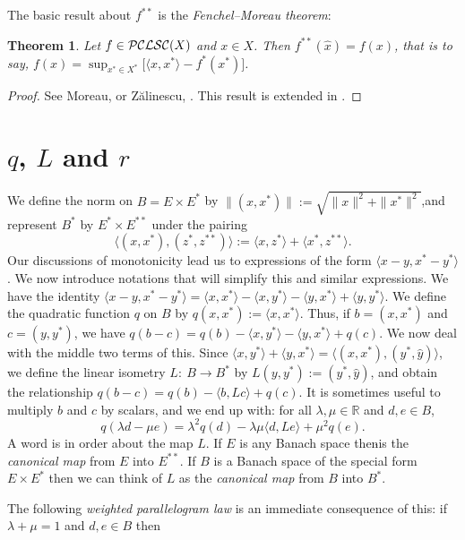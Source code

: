 \documentclass[letterpaper]{article}
\theoremstyle{plain}
\newtheorem{theorem}{Theorem}[section]
\theoremstyle{definition}
\numberwithin{equation}{section}
\newcommand{\bra}[2]{\langle#1,#2\rangle}
\newcommand{\Bra}[2]{\big\langle#1,#2\big\rangle}
\newcommand{\dbs}{^{**}}
\newcommand{\PCLSC}{{\cal PCLSC}}
\newcommand{\RR}{\mathbb R}
\newcommand{\supn}{\sup\nolimits}
\newcommand{\wh}{\widehat}
\newcommand{\Sec}{Section~\ref}
\newcommand{\Thm}{Theorem~\ref}
\begin{document}
%
The basic result about $f\dbs$ is the {\em Fenchel--Moreau theorem}:
\begin{theorem}\label{FMthm}
Let $f \in \PCLSC(X)$ and $x \in X$.   Then $f\dbs(\wh x) = f(x)$, that is to say, $f(x) = \supn_{x^* \in X^*}\big[\bra{x}{x^*} - f^*(x^*)\big]$.
\end{theorem}
%
\begin{proof}
See Moreau, \cite[Section 5--6, pp.\ 26--39]{MOREAU} or Z\u{a}linescu, \cite[Theorem 2.3.3 pp.\ 77--78]{ZBOOK}.   This result is extended in \cite[Section 12, pp.\ 58--60]{HBM}. 
\end{proof}
\section{$q$, $L$ and $r$}\label{RLsec}
We define the norm on $B = E \times E^*$ by $\|(x,x^*)\| := \sqrt{\|x\|^2 + \|x^*\|^2}$,\break and represent $B^*$ by $E^* \times E\dbs$ under the pairing
%
$$\Bra{(x,x^*)}{(z^*,z\dbs)} := \bra{x}{z^*} + \bra{x^*}{z\dbs}.$$
%
Our discussions of monotonicity lead us to expressions of the form $\bra{x - y}{x^* - y^*}$.  We now introduce notations that will simplify this and similar expressions.   We have the identity $\bra{x - y}{x^* - y^*} = \bra{x}{x^*} - \bra{x}{y^*} - \bra{y}{x^*} + \bra{y}{y^*}$.   We define the quadratic function $q$ on $B$ by $q(x,x^*) := \bra {x}{x^*}$.   Thus, if $b = (x,x^*)$ and $c = (y,y^*)$, we have $q(b - c) = q(b) - \bra{x}{y^*} - \bra{y}{x^*} + q(c)$.   We now deal with the middle two terms of this.   Since  $\bra{x}{y^*} + \bra{y}{x^*} = \Bra{(x,x^*)}{(y^*,\wh y)}$, we define 
the linear isometry $L\colon\ B \to B^*$ by $L(y,y^*) := (y^*,\wh{y})$, and obtain the relationship $q(b - c) = q(b) - \bra{b}{Lc} + q(c)$.   It is sometimes useful to multiply $b$ and $c$ by scalars, and we end up with: for all $\lambda, \mu \in \RR$ and $d,e \in B$,
\begin{equation}\label{not1}
q(\lambda d - \mu e) = \lambda^2q(d) -  \lambda\mu\bra{d}{Le} + \mu^2q(e).
\end{equation}
%
A word is in order about the map $L$.   If $E$ is any Banach space then\quad $\wh{}$\quad is the {\em canonical map} from $E$ into $E\dbs$.   If $B$ is a Banach space of the special form $E \times E^*$ then we can think of $L$ as the {\em canonical map} from $B$ into $B^*$.
\par 
The following {\em weighted parallelogram law} is an immediate consequence of this: if $\lambda + \mu = 1$ and $d,e \in B$ then 
\end{document}
